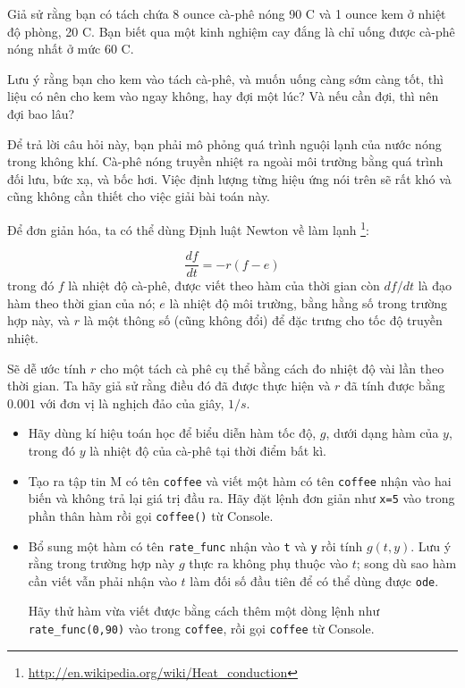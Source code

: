 \documentclass[12pt]{book}
\begin{document}
\begin{ex}
Giả sử rằng bạn có tách chứa 8 ounce cà-phê nóng 90 \degree C và
1 ounce kem ở nhiệt độ phòng, 20 \degree C. Bạn biết qua một 
kinh nghiệm cay đắng là chỉ uống được cà-phê nóng nhất ở mức
60 \degree C.

Lưu ý rằng bạn cho kem vào tách cà-phê, và muốn uống càng sớm
càng tốt, thì liệu có nên cho kem vào ngay không, hay đợi một lúc?
Và nếu cần đợi, thì nên đợi bao lâu?

Để trả lời câu hỏi này, bạn phải mô phỏng quá trình nguội lạnh của
nước nóng trong không khí. Cà-phê nóng truyền nhiệt ra ngoài 
môi trường bằng quá trình đối lưu, bức xạ, và bốc hơi. Việc định
lượng từng hiệu ứng nói trên sẽ rất khó và cũng không cần thiết
cho việc giải bài toán này.

Để đơn giản hóa, ta có thể dùng Định luật Newton về làm lạnh
\footnote{\url{http://en.wikipedia.org/wiki/Heat_conduction}}:

\[ \frac{df}{dt} = -r (f - e) \]
%
trong đó $f$ là nhiệt độ cà-phê, được viết theo hàm của thời gian
còn $df/dt$ là đạo hàm theo thời gian của nó; $e$ là nhiệt độ
môi trường, bằng hằng số trong trường hợp này, và $r$ là một
thông số (cũng không đổi) để đặc trưng cho tốc độ truyền nhiệt.

Sẽ dễ ước tính $r$ cho một tách cà phê cụ thể bằng cách đo 
nhiệt độ vài lần theo thời gian. Ta hãy giả sử rằng điều đó đã
được thực hiện và $r$ đã tính được bằng $0.001$ với đơn vị là
nghịch đảo của giây, $1/s$.

\begin{itemize}

\item Hãy dùng kí hiệu toán học để biểu diễn hàm tốc độ, $g$,
dưới dạng hàm của $y$, trong đó $y$ là nhiệt độ của cà-phê
tại thời điểm bất kì.

\item Tạo ra tập tin M có tên {\tt coffee} và viết một hàm có tên
{\tt coffee} nhận vào hai biến và không trả lại giá trị đầu ra.
Hãy đặt lệnh đơn giản như {\tt x=5} vào trong phần thân hàm
rồi gọi  {\tt coffee()} từ Console.

\item Bổ sung một hàm có tên \texttt{rate\_func} nhận vào 
{\tt t} và {\tt y} rồi tính $g(t,y)$.  Lưu ý rằng trong trường hợp này 
$g$ thực ra không phụ thuộc vào $t$; song dù sao hàm cần viết
vẫn phải nhận vào $t$ làm đối số đầu tiên để có thể dùng được 
{\tt ode}.

Hãy thử hàm vừa viết được bằng cách thêm một dòng lệnh như 
\verb#rate_func(0,90)# vào trong {\tt coffee}, 
rồi gọi {\tt coffee} từ Console.


\end{itemize}
\end{ex}
\end{document}
